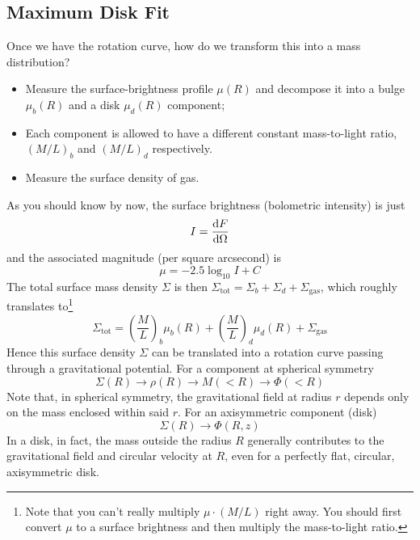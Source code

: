 \subsection{Maximum Disk Fit}

\par Once we have the rotation curve, how do we transform this into a mass distribution?
\begin{itemize}
    \item Measure the surface-brightness profile $\mu(R)$ and decompose it into a bulge $\mu_{b}(R)$ and a disk $\mu_{d}(R)$ component;
    \item Each component is allowed to have a different constant mass-to-light ratio, $(M/L)_{b}$ and $(M/L)_{d}$ respectively.
    \item Measure the surface density of gas.
\end{itemize}
As you should know by now, the surface brightness (bolometric intensity) is just
\begin{equation*}
    I = \frac{\text{d}F}{\text{d}\Omega}
\end{equation*}
and the associated magnitude (per square arcsecond) is 
\begin{equation*}
    \mu = -2.5\log_{10}I + C
\end{equation*}
The total surface mass density $\Sigma$ is then $\Sigma_{\text{tot}} = \Sigma_{b}+\Sigma_{d}+\Sigma_{\text{gas}}$, which roughly translates to\footnote{Note that you can't really multiply $\mu\cdot(M/L)$ right away. You should first convert $\mu$ to a surface brightness and then multiply the mass-to-light ratio.}
\begin{equation*}
    \Sigma_{\text{tot}} = \left(\frac{M}{L}\right)_{b}\mu_{b}(R)+\left(\frac{M}{L}\right)_{d}\mu_{d}(R)+\Sigma_{\text{gas}}
\end{equation*}
Hence this surface density $\Sigma$ can be translated into a rotation curve passing through a gravitational potential. For a component at spherical symmetry
\begin{equation*}
    \Sigma(R) \to \rho(R) \to M(<R) \to \Phi(<R)
\end{equation*}
Note that, in spherical symmetry, the gravitational field at radius $r$ depends only on the mass enclosed within said $r$. For an axisymmetric component (disk)
\begin{equation*}
    \Sigma(R) \to \Phi(R,z)
\end{equation*}
In a disk, in fact, the mass outside the radius $R$ generally contributes to the gravitational field and circular velocity at $R$, even for a perfectly flat, circular, axisymmetric disk.
